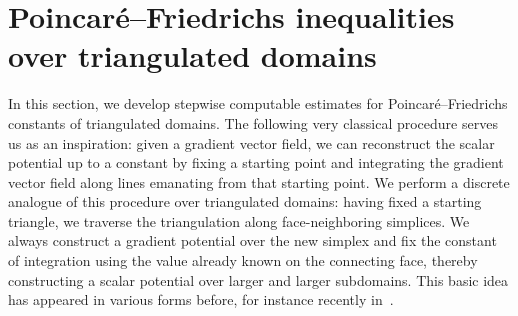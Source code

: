 \documentclass[10pt,a4paper]{article}
\newcommand\cye[1]{%
\protect\leavevmode
\begingroup
    \color{blue}%
    #1%
\endgroup
}
\begin{document}
\section{Poincar\'e--Friedrichs inequalities over triangulated domains}\label{section:gradient}

In this section, we develop stepwise computable estimates for Poincar\'e--Friedrichs constants of triangulated domains. 
The following very classical procedure serves us as an inspiration: given a gradient vector field, we can reconstruct the scalar potential up to a constant by fixing a starting point and integrating the gradient vector field along lines emanating from that starting point. 
We perform a discrete analogue of this procedure over triangulated domains: 
having fixed a starting triangle, we traverse the triangulation along face-neighboring simplices.
We always construct a gradient potential over the new simplex and fix the constant of integration using the value already known on the connecting face, thereby constructing a scalar potential over larger and larger subdomains.
This basic idea has appeared in various forms before, for instance recently in~\cite{Brae_Pill_Sch_p_rob_09, ern2020stable, Chaum_Voh_p_rob_3D_H_curl_24, Voh_loc_glob_H1_24}.



% 
\end{document}
